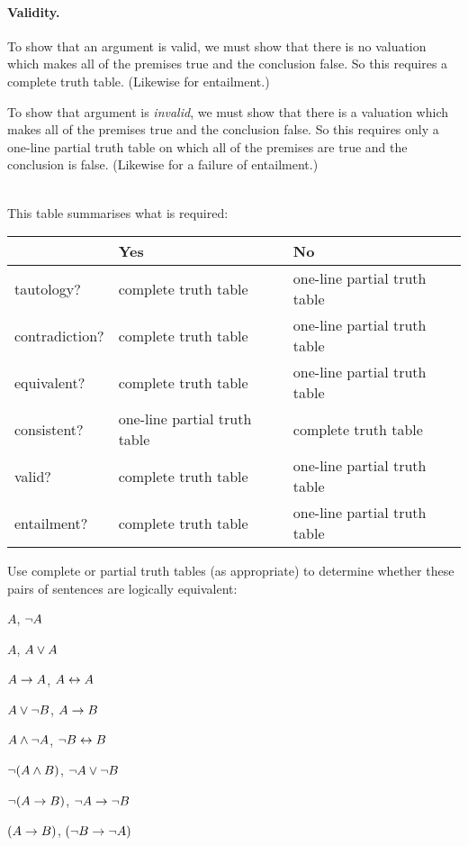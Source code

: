 \paragraph{Validity.}
To show that an argument is valid, we must show that there is no valuation which makes all of the premises true and the conclusion false. So this  requires a complete truth table.  (Likewise for entailment.)

To show that argument is \emph{invalid}, we must show that there is a valuation which makes all of the premises true and the conclusion false. So this requires only a one-line partial truth table on which all of the premises are true and the conclusion is false. (Likewise for a failure of entailment.)


\
\\This table summarises what is required:

\begin{center}
\begin{tabular}{l l l}
 & \textbf{Yes} & \textbf{No}\\
 \hline
tautology? & complete truth table & one-line partial truth table\\
contradiction? &  complete truth table  & one-line partial truth table\\
equivalent? & complete truth table & one-line partial truth table\\
consistent? & one-line partial truth table & complete truth table\\
valid? & complete truth table & one-line partial truth table\\
entailment? & complete truth table & one-line partial truth table\\
\end{tabular}
\end{center}
\label{table.CompleteVsPartial}


\practiceproblems
\solutions

\solutions
\problempart
\label{pr.TT.equiv}
Use complete or partial truth tables (as appropriate) to determine whether these pairs of sentences are logically equivalent:
\begin{earg}
\item $A$, $\neg A$ %
\item $A$, $A \vee A$ %
\item $A\rightarrow A$, $A \leftrightarrow A$ %
\item $A \vee \neg B$, $A\rightarrow B$ %
\item $A \wedge \neg A$, $\neg B \leftrightarrow B$ %
\item $\neg(A \wedge B)$, $\neg A \vee \neg B$ %
\item $\neg(A \rightarrow B)$, $\neg A \rightarrow \neg B$ %
\item $(A \rightarrow B)$, $(\neg B \rightarrow \neg A)$ %
\end{earg}

